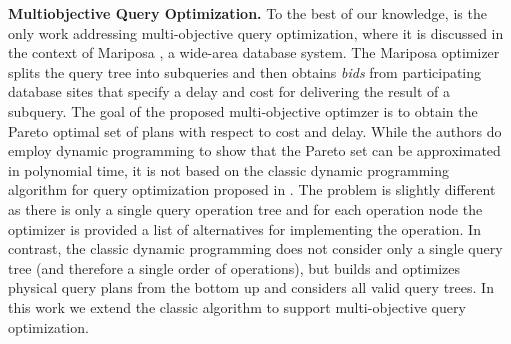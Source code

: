 \textbf{Multiobjective Query Optimization.} To the best of our
knowledge, \cite{papadimitriou_multiobjective_2001} is the only work
addressing multi-objective query optimization, where it is discussed
in the context of Mariposa \cite{stonebraker_mariposa:_1996}, a
wide-area database system. The Mariposa optimizer splits the query
tree into subqueries and then obtains \emph{bids} from participating
database sites that specify a delay and cost for delivering the result
of a subquery. The goal of the proposed multi-objective optimzer
\cite{papadimitriou_multiobjective_2001} is to obtain the Pareto
optimal set of plans with respect to cost and delay. While the authors
do employ dynamic programming to show that the Pareto set can be
approximated in polynomial time, it is not based on the classic
dynamic programming algorithm for query optimization proposed in
\cite{selinger_access_1979}. The problem is slightly different as
there is only a single query operation tree and for each operation
node the optimizer is provided a list of alternatives for implementing
the operation. In contrast, the classic dynamic programming
\cite{selinger_access_1979} does not consider only a single query tree
(and therefore a single order of operations), but builds and optimizes
physical query plans from the bottom up and considers all valid query
trees. In this work we extend the classic algorithm to support
multi-objective query optimization.












